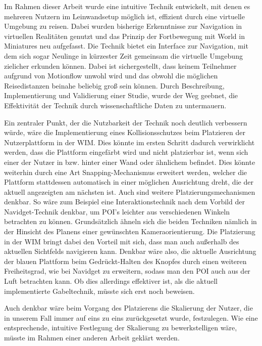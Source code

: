 Im Rahmen dieser Arbeit wurde eine intuitive Technik entwickelt, mit denen es mehreren Nutzern im Leinwandsetup möglich ist, effizient durch eine virtuelle Umgebung zu reisen. Dabei wurden bisherige Erkenntnisse zur Navigation in virtuellen Realitäten genutzt und das Prinzip der Fortbewegung mit World in Miniatures neu aufgefasst.
Die Technik bietet ein Interface zur Navigation, mit dem sich sogar Neulinge in kürzester Zeit gemeinsam die virtuelle Umgebung zielicher erkunden können. Dabei ist sichergestellt, dass keinem Teilnehmer aufgrund von Motionflow unwohl wird und das obwohl die möglichen Reisedistanzen beinahe beliebig groß sein können.
Durch Beschreibung, Implementierung und Validierung einer Studie, wurde der Weg geebnet, die Effektivität der Technik durch wissenschaftliche Daten zu untermauern.

Ein zentraler Punkt, der die Nutzbarkeit der Technik noch deutlich verbessern würde, wäre die Implementierung eines Kollisionsschutzes beim Platzieren der Nutzerplattform in der WIM. Dies könnte im ersten Schritt dadurch verwirklicht werden, dass die Plattform eingefärbt wird und nicht platzierbar ist, wenn sich einer der Nutzer in bzw. hinter einer Wand oder ähnlichem befindet. Dies könnte weiterhin durch eine Art \glqq Snapping\grqq{}-Mechanismus erweitert werden, welcher die Plattform stattdessen automatisch in einer möglichen Ausrichtung dreht, die der aktuell angezeigten am nächsten ist.
Auch sind weitere Platzierungsmechanismen denkbar. So wäre zum Beispiel eine Interaktionstechnik nach dem Vorbild der Navidget-Technik \cite{HACHET2009225} denkbar, um POI's leichter aus verschiedenen Winkeln betrachten zu können. Grundsätzlich ähneln sich die beiden Techniken nämlich in der Hinsicht des Planens einer gewünschten Kameraorientierung. Die Platzierung in der WIM bringt dabei den Vorteil mit sich, dass man auch außerhalb des aktuellen Sichtfelds navigieren kann. Denkbar wäre also, die aktuelle Ausrichtung der blauen Plattform beim Gedrückt-Halten des Knopfes durch einen weiteren Freiheitsgrad, wie bei Navidget zu erweitern, sodass man den POI auch aus der Luft betrachten kann. Ob dies allerdings effektiver ist, als die aktuell implementierte Gabeltechnik, müsste sich erst noch beweisen.

Auch denkbar wäre beim Vorgang des Platzierens die Skalierung der Nutzer, die in unserem Fall immer auf eins zu eins zurückgesetzt wurde, festzulegen. Wie eine entsprechende, intuitive Festlegung der Skalierung zu bewerkstelligen wäre, müsste im Rahmen einer anderen Arbeit geklärt werden.

